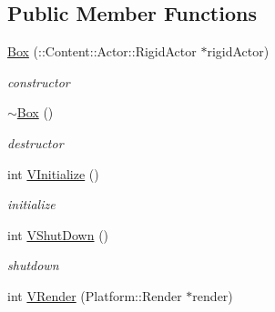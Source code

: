 \subsection*{Public Member Functions}
\begin{DoxyCompactItemize}
\item 
\hypertarget{classContent_1_1Shape_1_1Box_a76d1309c134fd3782bd5ac8c9fe07184}{
\hyperlink{classContent_1_1Shape_1_1Box_a76d1309c134fd3782bd5ac8c9fe07184}{Box} (::Content::Actor::RigidActor $\ast$rigidActor)}
\label{classContent_1_1Shape_1_1Box_a76d1309c134fd3782bd5ac8c9fe07184}

\begin{DoxyCompactList}\small\item\em constructor \item\end{DoxyCompactList}\item 
\hypertarget{classContent_1_1Shape_1_1Box_aa41be69dc68ef8a44452f2e053625195}{
\hyperlink{classContent_1_1Shape_1_1Box_aa41be69dc68ef8a44452f2e053625195}{$\sim$Box} ()}
\label{classContent_1_1Shape_1_1Box_aa41be69dc68ef8a44452f2e053625195}

\begin{DoxyCompactList}\small\item\em destructor \item\end{DoxyCompactList}\item 
\hypertarget{classContent_1_1Shape_1_1Box_a255e26ecfe82c53fb8da2fb1cb77d48f}{
int \hyperlink{classContent_1_1Shape_1_1Box_a255e26ecfe82c53fb8da2fb1cb77d48f}{VInitialize} ()}
\label{classContent_1_1Shape_1_1Box_a255e26ecfe82c53fb8da2fb1cb77d48f}

\begin{DoxyCompactList}\small\item\em initialize \item\end{DoxyCompactList}\item 
\hypertarget{classContent_1_1Shape_1_1Box_ace132e2ca9a259b4cc916c947661f636}{
int \hyperlink{classContent_1_1Shape_1_1Box_ace132e2ca9a259b4cc916c947661f636}{VShutDown} ()}
\label{classContent_1_1Shape_1_1Box_ace132e2ca9a259b4cc916c947661f636}

\begin{DoxyCompactList}\small\item\em shutdown \item\end{DoxyCompactList}\item 
\hypertarget{classContent_1_1Shape_1_1Box_a863480c2f1563c32e3e2882e10c8eee2}{
int \hyperlink{classContent_1_1Shape_1_1Box_a863480c2f1563c32e3e2882e10c8eee2}{VRender} (Platform::Render $\ast$render)}
\label{classContent_1_1Shape_1_1Box_a863480c2f1563c32e3e2882e10c8eee2}


\end{DoxyCompactItemize}
